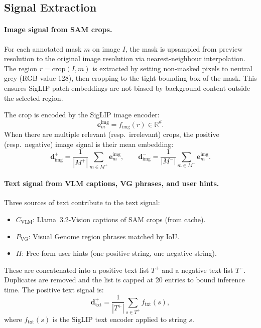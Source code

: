 \documentclass[12pt,a4paper]{article}
\newcommand{\vd}{\bm{d}}
\newcommand{\ve}{\bm{e}}
\begin{document}
\subsection{Signal Extraction}

\paragraph{Image signal from SAM crops.}
For each annotated mask $m$ on image $I$, the mask is upsampled from preview
resolution to the original image resolution via nearest-neighbour interpolation.
The region $r = \text{crop}(I, m)$ is extracted by setting non-masked pixels
to neutral grey (RGB value 128), then cropping to the tight bounding box of
the mask. This ensures SigLIP patch embeddings are not biased by background
content outside the selected region.

The crop is encoded by the SigLIP image encoder:
\begin{equation}
  \ve^{\text{img}}_m = f_{\text{img}}(r) \in \mathbb{R}^d.
\end{equation}
When there are multiple relevant (resp.\ irrelevant) crops, the positive
(resp.\ negative) image signal is their mean embedding:
\begin{equation}
  \vd^+_{\text{img}} = \frac{1}{|M^+|}\sum_{m \in M^+} \ve^{\text{img}}_m,
  \qquad
  \vd^-_{\text{img}} = \frac{1}{|M^-|}\sum_{m \in M^-} \ve^{\text{img}}_m.
\end{equation}

\paragraph{Text signal from VLM captions, VG phrases, and user hints.}
Three sources of text contribute to the text signal:
\begin{itemize}[leftmargin=1.5em,noitemsep]
  \item $C_{\text{VLM}}$: Llama~3.2-Vision captions of SAM crops (from cache).
  \item $P_{\text{VG}}$: Visual Genome region phrases matched by IoU.
  \item $H$: Free-form user hints (one positive string, one negative string).
\end{itemize}
These are concatenated into a positive text list $T^+$ and a negative text
list $T^-$. Duplicates are removed and the list is capped at 20 entries to
bound inference time. The positive text signal is:
\begin{equation}
  \vd^+_{\text{txt}} = \frac{1}{|T^+|}\sum_{s \in T^+} f_{\text{txt}}(s),
\end{equation}
where $f_{\text{txt}}(s)$ is the SigLIP text encoder applied to string $s$.
\end{document}
